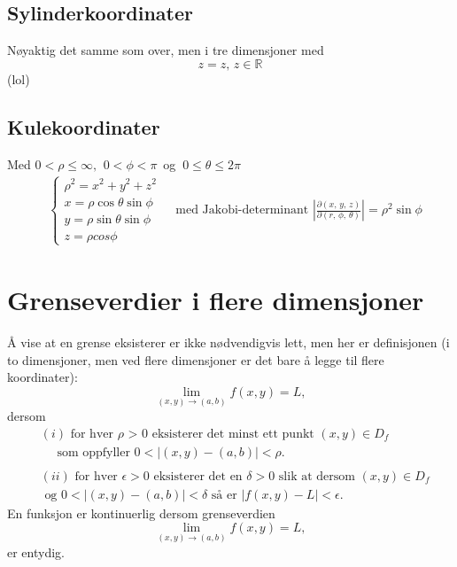\documentclass[fleqn,12pt]{wlscirep}
\begin{document}
\subsection{Sylinderkoordinater}
Nøyaktig det samme som over, men i tre dimensjoner med 
\begin{equation}
    z = z, \, z\in \mathbb{R}
\end{equation}
(lol)
\subsection{Kulekoordinater}
Med $0 < \rho\leq \infty,
   \, \ 0<\phi < \pi \,
   $ og $ \ 0\leq \theta \leq 2\pi$
    \begin{align}
    &\begin{cases}
    \rho^2 = x^2 + y^2+z^2\\
    x = \rho \cos{\theta}\sin{\phi}\\
    y = \rho  \sin{\theta}\sin{\phi}\\
    z = \rho cos{\phi}
    \end{cases}
    &\text{ med Jakobi-determinant } \left|\frac{\partial(x,\,y,\,z)}{\partial(r,\,\phi,\, \theta)}\right| = \rho^2 \sin{\phi}
\end{align}
\section{Grenseverdier i flere dimensjoner}
Å vise at en grense eksisterer er ikke nødvendigvis lett, men her er definisjonen (i to dimensjoner, men ved flere dimensjoner er det bare å legge til flere koordinater):
\begin{equation}
    \lim_{(x,y)\to (a,b)} f(x,y) = L,
\end{equation}
dersom
\begin{align*}
    &(i)\text{ for hver $\rho$ > 0 eksisterer det minst ett punkt } (x,y)\in D_f \\ &\quad\text{ som oppfyller } 0 < |(x,y)-(a,b)| < \rho.\\ \\
    &(ii) \text{ for hver $\epsilon > 0$ eksisterer det en $\delta > 0$ slik at dersom } (x,y) \in D_f\\ &\text{ og } 0 < |(x,y)-(a,b)| < \delta \text{ så er }|f(x,y) - L| < \epsilon.
\end{align*}
\noindent En funksjon er kontinuerlig dersom grenseverdien \begin{equation}
    \lim_{(x,y)\to (a,b)} f(x,y) = L,
\end{equation} 
er entydig.
\end{document}
